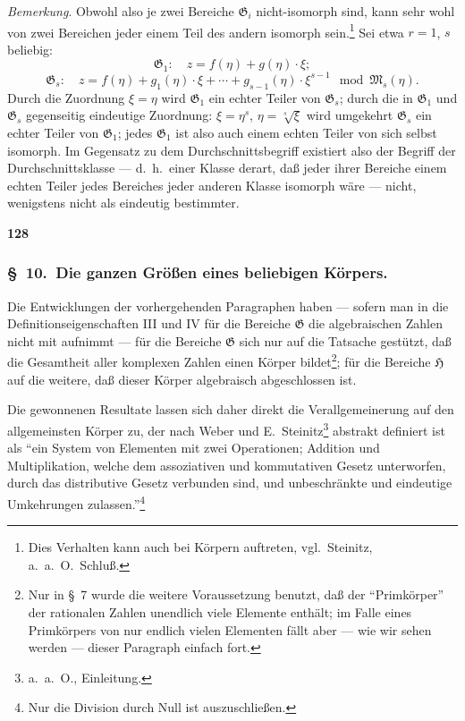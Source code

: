 \documentclass[12pt,a4paper]{article}
\begin{document}
\emph{Bemerkung}. Obwohl also je zwei Bereiche $\mathfrak{G}_i$ nicht-isomorph sind, kann sehr wohl von zwei Bereichen jeder einem Teil des andern isomorph sein.\footnote{Dies Verhalten kann auch bei K\"orpern auftreten, vgl.\ Steinitz, a.\ a.\ O.\ Schlu\ss .} Sei etwa $r = 1$, $s$ beliebig:
\[\mathfrak{G}_1: \quad z = f(\eta) + g(\eta) \cdot \xi;\]
\[\mathfrak{G}_s: \quad z = f(\eta) + g_1(\eta) \cdot \xi + \cdots + g_{s-1}(\eta) \cdot \xi^{s-1} \mod \mathfrak{M}_s(\eta).\]
Durch die Zuordnung $\xi = \eta$ wird $\mathfrak{G}_1$ ein echter Teiler von $\mathfrak{G}_s$; durch die in $\mathfrak{G}_1$ und $\mathfrak{G}_s$ gegenseitig eindeutige Zuordnung: $\xi = \eta^s$, $\eta = \sqrt[s]{\xi}$ wird umgekehrt $\mathfrak{G}_s$ ein echter Teiler von $\mathfrak{G}_1$; jedes $\mathfrak{G}_1$ ist also auch einem echten Teiler von sich selbst isomorph. Im Gegensatz zu dem Durchschnittsbegriff existiert also der Begriff der Durchschnittsklasse --- d.\ h.\ einer Klasse derart, da\ss{} jeder ihrer Bereiche einem echten Teiler jedes Bereiches jeder anderen Klasse isomorph w\"are --- nicht, wenigstens nicht als eindeutig bestimmter.

\newpage
\begin{center}
\textbf{128}
\end{center}

\subsubsection*{\S\ 10.\ Die ganzen Gr\"o\ss en eines beliebigen K\"orpers.}

Die Entwicklungen der vorhergehenden Paragraphen haben --- sofern man in die Definitionseigenschaften III und IV f\"ur die Bereiche $\mathfrak{G}$ die algebraischen Zahlen nicht mit aufnimmt --- f\"ur die Bereiche $\mathfrak{G}$ sich nur auf die Tatsache gest\"utzt, da\ss{} die Gesamtheit aller komplexen Zahlen einen K\"orper bildet\footnote{Nur in \S\ 7 wurde die weitere Voraussetzung benutzt, da\ss{} der ``Primk\"orper'' der rationalen Zahlen unendlich viele Elemente enth\"alt; im Falle eines Primk\"orpers von nur endlich vielen Elementen f\"allt aber --- wie wir sehen werden --- dieser Paragraph einfach fort.}; f\"ur die Bereiche $\mathfrak{H}$ auf die weitere, da\ss{} dieser K\"orper algebraisch abgeschlossen ist.

Die gewonnenen Resultate lassen sich daher direkt die Verallgemeinerung auf den allgemeinsten K\"orper zu, der nach Weber und E.\ Steinitz\footnote{a.\ a.\ O., Einleitung.} abstrakt definiert ist als ``ein System von Elementen mit zwei Operationen; Addition und Multiplikation, welche dem assoziativen und kommutativen Gesetz unterworfen, durch das distributive Gesetz verbunden sind, und unbeschr\"ankte und eindeutige Umkehrungen zulassen.''\footnote{Nur die Division durch Null ist auszuschlie\ss en.}
\end{document}
